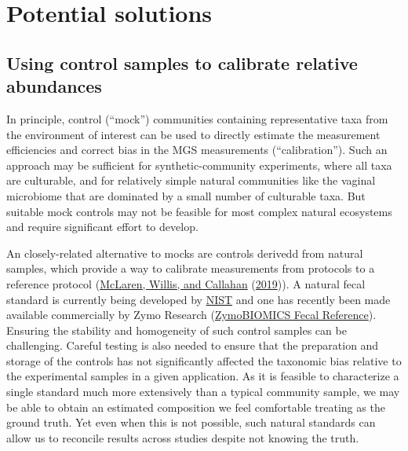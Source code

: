 \documentclass[
]{article}
\theoremstyle{definition}
\theoremstyle{definition}
\theoremstyle{definition}
\theoremstyle{definition}
\theoremstyle{remark}
\begin{document}
\hypertarget{potential-solutions}{%
\section{Potential solutions}\label{potential-solutions}}

\hypertarget{using-control-samples-to-calibrate-relative-abundances}{%
\subsection{Using control samples to calibrate relative abundances}\label{using-control-samples-to-calibrate-relative-abundances}}

In principle, control (``mock'') communities containing representative taxa from the environment of interest can be used to directly estimate the measurement efficiencies and correct bias in the MGS measurements (``calibration'').
Such an approach may be sufficient for synthetic-community experiments, where all taxa are culturable, and for relatively simple natural communities like the vaginal microbiome that are dominated by a small number of culturable taxa.
But suitable mock controls may not be feasible for most complex natural ecosystems and require significant effort to develop.

An closely-related alternative to mocks are controls derivedd from natural samples, which provide a way to calibrate measurements from protocols to a reference protocol (\protect\hyperlink{ref-mclaren2019cons}{McLaren, Willis, and Callahan} (\protect\hyperlink{ref-mclaren2019cons}{2019})).
A natural fecal standard is currently being developed by \href{https://www.nist.gov/programs-projects/human-gut-microbiome-reference-material}{NIST} and one has recently been made available commercially by Zymo Research (\href{https://www.zymoresearch.com/collections/zymobiomics-microbial-community-standards/products/zymobiomics-fecal-reference-with-trumatrix-technology}{ZymoBIOMICS Fecal Reference}).
Ensuring the stability and homogeneity of such control samples can be challenging.
Careful testing is also needed to ensure that the preparation and storage of the controls has not significantly affected the taxonomic bias relative to the experimental samples in a given application.
As it is feasible to characterize a single standard much more extensively than a typical community sample, we may be able to obtain an estimated composition we feel comfortable treating as the ground truth.
Yet even when this is not possible, such natural standards can allow us to reconcile results across studies despite not knowing the truth.
\end{document}
